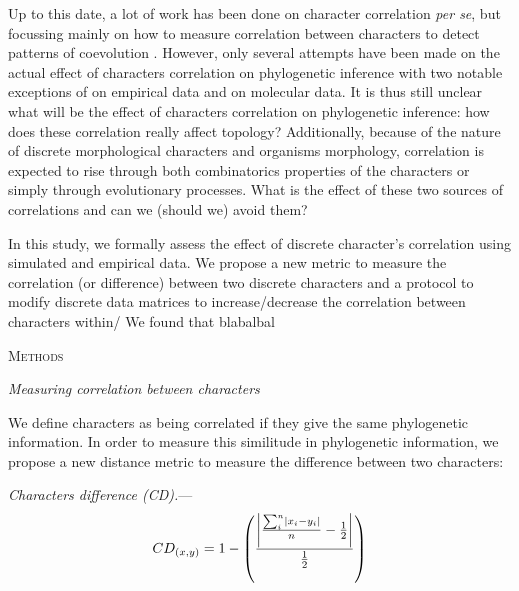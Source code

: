 \documentclass[12pt,letterpaper]{article}
\DeclarePairedDelimiter\abs{\lvert}{\rvert}%
\renewcommand{\section}[1]{%
\bigskip
\begin{center}
\begin{Large}
\normalfont\scshape #1
\medskip
\end{Large}
\end{center}}
\renewcommand{\subsection}[1]{%
\bigskip
\begin{center}
\begin{large}
\normalfont\itshape #1
\end{large}
\end{center}}
\renewcommand{\subsubsection}[1]{%
\vspace{2ex}
\noindent
\textit{#1.}---}
\begin{document}
Up to this date, a lot of work has been done on character correlation \textit{per se}, but focussing mainly on how to measure correlation between characters to detect patterns of coevolution \citep{Lande1983,Maddison1990,Pagel1994,Pagel2006,Grabowski2016}.
However, only several attempts have been made on the actual effect of characters correlation on phylogenetic inference with two notable exceptions of \cite{Davalos01072014} on empirical data and \cite{ZouConvergence} on molecular data.
It is thus still unclear what will be the effect of characters correlation on phylogenetic inference: how does these correlation really affect topology?
Additionally, because of the nature of discrete morphological characters and organisms morphology, correlation is expected to rise through both combinatorics properties of the characters or simply through evolutionary processes.
What is the effect of these two sources of correlations and can we (should we) avoid them?

In this study, we formally assess the effect of discrete character's correlation using simulated and empirical data.
We propose a new metric to measure the correlation (or difference) between two discrete characters and a protocol to modify discrete data matrices to increase/decrease the correlation between characters within/
We found that blabalbal

\section{Methods}

\subsection{Measuring correlation between characters}

We define characters as being correlated if they give the same phylogenetic information.
In order to measure this similitude in phylogenetic information, we propose a new distance metric to measure the difference between two characters:

\subsubsection{Characters difference (CD)}
\begin{equation}
    CD_{(x,y)} = 1 - \left(\frac{\abs*{\frac{\sum_{i}^{n}\abs{x_{i} - y_{i}}}{n}-\frac{1}{2}}}{\frac{1}{2}}\right)
\end{equation}
\end{document}
